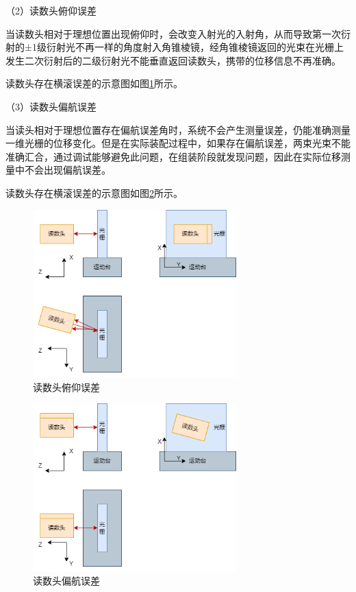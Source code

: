 \documentclass[type=master,oneside]{fduthesis}
\begin{document}
（2）读数头俯仰误差

当读数头相对于理想位置出现俯仰时，会改变入射光的入射角，从而导致第一次衍射的±1级衍射光不再一样的角度射入角锥棱镜，经角锥棱镜返回的光束在光栅上发生二次衍射后的二级衍射光不能垂直返回读数头，携带的位移信息不再准确。

读数头存在横滚误差的示意图如图\ref{fig:读数头俯仰误差三视图}所示。

（3）读数头偏航误差

当读头相对于理想位置存在偏航误差角时，系统不会产生测量误差，仍能准确测量一维光栅的位移变化。但是在实际装配过程中，如果存在偏航误差，两束光束不能准确汇合，通过调试能够避免此问题，在组装阶段就发现问题，因此在实际位移测量中不会出现偏航误差。

读数头存在横滚误差的示意图如图\ref{fig:读数头偏航误差三视图}所示。

\begin{figure}[H]
  \centering
  \includegraphics[width=0.7\textwidth]{4-fig//读数头俯仰误差.png}
  \caption{读数头俯仰误差}
  \label{fig:读数头俯仰误差三视图}
\end{figure}
\begin{figure}[H]
  \centering
  \includegraphics[width=0.7\textwidth]{4-fig//读数头偏航误差.png}
  \caption{读数头偏航误差}
  \label{fig:读数头偏航误差三视图}
\end{figure}
\end{document}
